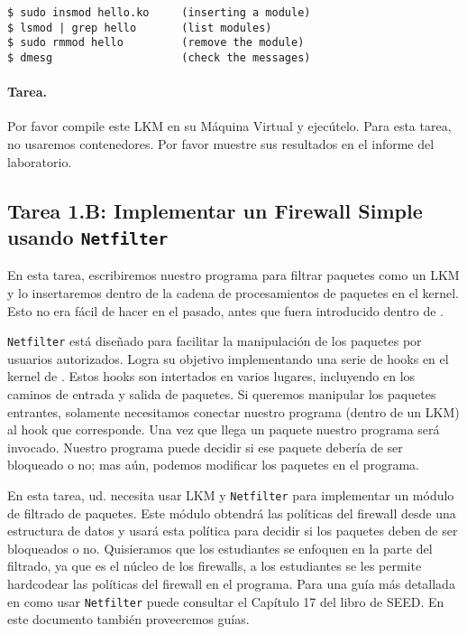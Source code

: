 \begin{lstlisting}
$ sudo insmod hello.ko     (inserting a module)
$ lsmod | grep hello       (list modules)
$ sudo rmmod hello         (remove the module)
$ dmesg                    (check the messages)
\end{lstlisting}


\paragraph{Tarea.} Por favor compile este LKM en su Máquina Virtual y ejecútelo. Para esta tarea, no usaremos contenedores. Por favor muestre sus resultados en el informe del laboratorio.


\subsection{Tarea 1.B: Implementar un Firewall Simple usando \texttt{Netfilter}}  

En esta tarea, escribiremos nuestro programa para filtrar paquetes como un LKM y lo insertaremos dentro de la cadena de procesamientos de paquetes en el kernel. Esto no era fácil de hacer en el pasado, antes que \netfilter fuera introducido dentro de \linux.

{\tt Netfilter} está diseñado para facilitar la manipulación de los paquetes por usuarios autorizados. Logra su objetivo implementando una serie de hooks en el kernel de \linux. Estos hooks son intertados en varios lugares, incluyendo en los caminos de entrada y salida de paquetes.
Si queremos manipular los paquetes entrantes, solamente necesitamos conectar nuestro programa (dentro de un LKM) al hook que corresponde. Una vez que llega un paquete nuestro programa será invocado. Nuestro programa puede decidir si ese paquete debería de ser bloqueado o no; mas aún, podemos modificar los paquetes en el programa.

En esta tarea, ud. necesita usar LKM y {\tt Netfilter} para implementar un módulo de filtrado de paquetes. Este módulo obtendrá las políticas del firewall desde una estructura de datos y usará esta política para decidir si los paquetes deben de ser bloqueados o no.
Quisieramos que los estudiantes se enfoquen en la parte del filtrado, ya que es el núcleo de los firewalls, a los estudiantes se les permite hardcodear las políticas del firewall en el programa. Para una guía más detallada en como usar \texttt{Netfilter} puede consultar el Capítulo 17 del libro de SEED. 
En este documento también proveeremos guías.


